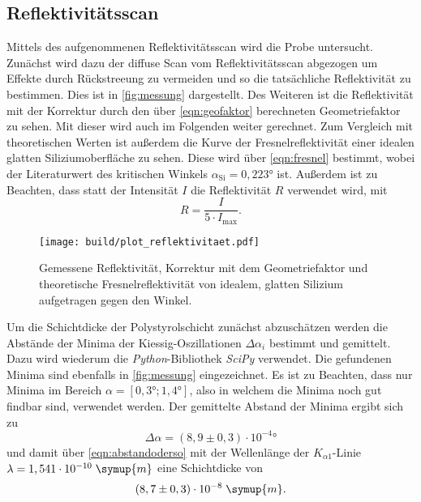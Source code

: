 \subsection{Reflektivitätsscan}
Mittels des aufgenommenen Reflektivitätsscan wird die Probe untersucht. Zunächst wird dazu der 
diffuse Scan vom Reflektivitätsscan abgezogen um Effekte durch Rückstreeung zu vermeiden und so 
die tatsächliche Reflektivität zu bestimmen. Dies ist in \autoref{fig:messung}
dargestellt. Des Weiteren ist die Reflektivität mit der Korrektur durch den über 
\autoref{eqn:geofaktor} berechneten Geometriefaktor zu sehen. Mit dieser wird auch im Folgenden 
weiter gerechnet. Zum Vergleich mit theoretischen Werten ist außerdem die Kurve der Fresnelreflektivität 
einer idealen glatten Siliziumoberfläche zu sehen. Diese wird über 
\autoref{eqn:fresnel} bestimmt, wobei der Literaturwert des kritischen Winkels $\alpha_{\text{Si}} = 0,223°$ \cite{tolan} ist.
Außerdem ist zu Beachten, dass statt der Intensität $I$ die Reflektivität $R$ verwendet wird,
mit
\begin{equation*}
    R = \frac{I}{5 \cdot I_{\text{max}}}.
\end{equation*}
\begin{figure}
    \centering
    \texttt{[image: build/plot\_reflektivitaet.pdf]}
    \caption{Gemessene Reflektivität, Korrektur mit dem Geometriefaktor und theoretische Fresnelreflektivität von idealem, glatten Silizium aufgetragen gegen den Winkel.}
    \label{fig:messung}
\end{figure}

Um die Schichtdicke der Polystyrolschicht zunächst abzuschätzen werden die Abstände der Minima der Kiessig-Oszillationen $\Delta \alpha_i$
bestimmt und gemittelt. Dazu wird wiederum die \textit{Python}-Bibliothek \textit{SciPy} \cite{scipy}
verwendet. Die gefundenen Minima sind ebenfalls in \autoref{fig:messung} eingezeichnet.
Es ist zu Beachten, dass nur Minima im Bereich $\alpha = [0,3°; 1,4°]$, also in welchem 
die Minima noch gut findbar sind, verwendet werden.
Der gemittelte Abstand der Minima ergibt sich zu 
\begin{equation*}
    \Delta \alpha = (8,9 \pm 0,3) \cdot 10^{-4}°
\end{equation*}
und damit über \autoref{eqn:abstandoderso} mit der Wellenlänge der $K_{\alpha 1}$-Linie 
$\lambda = 1,541 \cdot 10^{-10} \; \symup{m}$ eine Schichtdicke von
\begin{equation*}
    (8,7 \pm 0,3)\cdot 10^{-8} \; \symup{m}.
\end{equation*}

